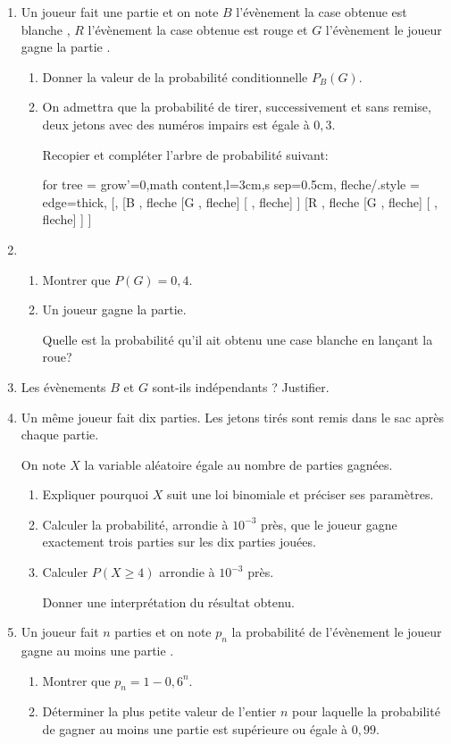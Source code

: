 \begin{enumerate}
	\item Un joueur fait une partie et on note $B$ l'évènement \og la case obtenue est blanche \fg,
	$R$ l'évènement \og la case obtenue est rouge\fg{} et $G$ l'évènement \og le joueur gagne la partie \fg. 
	\begin{enumerate}
		\item Donner la valeur de la probabilité conditionnelle $P_B(G)$.
		\item On admettra que la probabilité de tirer, successivement et sans remise, deux jetons avec des numéros impairs est égale à $0,3$.
		
		Recopier et compléter l'arbre de probabilité suivant:
		
		\begin{center}
			\begin{forest}
				for tree = {grow'=0,math content,l=3cm,s sep=0.5cm},
				fleche/.style = {edge={thick}},
				[,
				[B , fleche
				[G , fleche]
				[ , fleche]
				]
				[R , fleche
				[G , fleche]
				[ , fleche]
				]
				]
			\end{forest}
		\end{center}
	\end{enumerate}
	\item
	\begin{enumerate}
		\item Montrer que $P(G) = 0,4$.
		\item Un joueur gagne la partie.
		
		Quelle est la probabilité qu'il ait obtenu une case blanche en lançant la roue?
	\end{enumerate}
	\item Les évènements $B$ et $G$ sont-ils indépendants ? Justifier.
	\item Un même joueur fait dix parties. Les jetons tirés sont remis dans le sac après chaque partie.
	
	On note $X$ la variable aléatoire égale au nombre de parties gagnées.
	\begin{enumerate}
		\item Expliquer pourquoi $X$ suit une loi binomiale et préciser ses paramètres.
		\item Calculer la probabilité, arrondie à $10^{-3}$ près, que le joueur gagne exactement trois parties sur les dix parties jouées.
		\item Calculer $P (X \geqslant 4)$ arrondie à $10^{-3}$ près.
		
		Donner une interprétation du résultat obtenu.
	\end{enumerate}
	\item Un joueur fait $n$ parties et on note $p_n$ la probabilité de l'évènement \og le joueur gagne au moins une partie \fg.
	\begin{enumerate}
		\item Montrer que $p_n = 1 - 0,6^n$.
		\item Déterminer la plus petite valeur de l'entier $n$ pour laquelle la probabilité de gagner au moins une partie est supérieure ou égale à $0,99$.
	\end{enumerate}
\end{enumerate}

